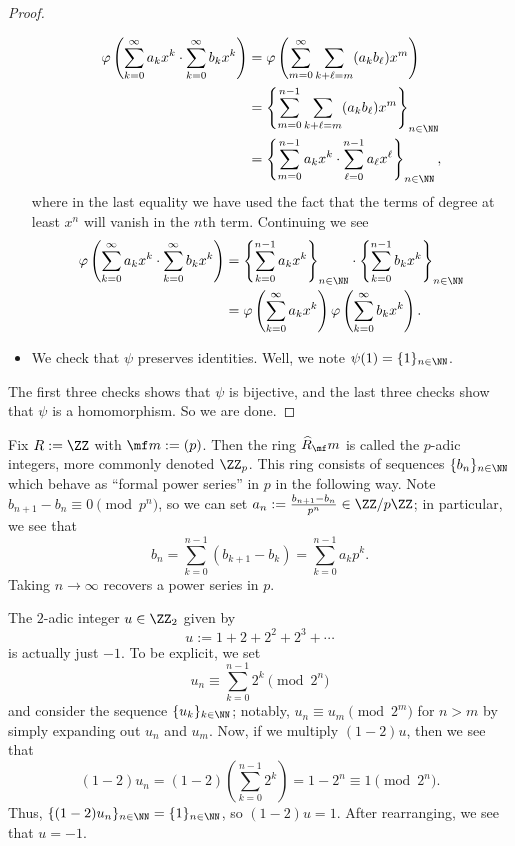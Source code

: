\begin{proof}
\begin{itemize}
		\begin{align*}
			\varphi\left(\sum_{k=0}^\infty a_kx^k\cdot\sum_{k=0}^\infty b_kx^k\right) &= \varphi\left(\sum_{m=0}^\infty\sum_{k+\ell=m}(a_kb_\ell)x^m\right) \\
			&= \left\{\sum_{m=0}^{n-1}\sum_{k+\ell=m}(a_kb_\ell)x^m\right\}_{n\in\NN} \\
			&= \left\{\sum_{m=0}^{n-1}a_kx^k\cdot\sum_{\ell=0}^{n-1}a_\ell x^\ell\right\}_{n\in\NN},
		\end{align*}
		where in the last equality we have used the fact that the terms of degree at least $x^n$ will vanish in the $n$th term. Continuing we see
		\begin{align*}
			\varphi\left(\sum_{k=0}^\infty a_kx^k\cdot\sum_{k=0}^\infty b_kx^k\right) &= \left\{\sum_{k=0}^{n-1}a_kx^k\right\}_{n\in\NN}\cdot\left\{\sum_{k=0}^{n-1}b_kx^k\right\}_{n\in\NN} \\
			&= \varphi\left(\sum_{k=0}^\infty a_kx^k\right)\varphi\left(\sum_{k=0}^\infty b_kx^k\right).
		\end{align*}
		\item We check that $\psi$ preserves identities. Well, we note $\psi(1)=\{1\}_{n\in\NN}$.
	\end{itemize}
	The first three checks shows that $\psi$ is bijective, and the last three checks show that $\psi$ is a homomorphism. So we are done.
\end{proof}
\begin{example}
	Fix $R:=\ZZ$ with $\mf m:=(p)$. Then the ring $\widehat R_\mf m$ is called the $p$-adic integers, more commonly denoted $\ZZ_p$. This ring consists of sequences $\{b_n\}_{n\in\NN}$ which behave as ``formal power series'' in $p$ in the following way. Note $b_{n+1}-b_n\equiv0\pmod{p^n}$, so we can set $a_n:=\frac{b_{n+1}-b_n}{p^n}\in\ZZ/p\ZZ$; in particular, we see that
	\[b_n=\sum_{k=0}^{n-1}(b_{k+1}-b_k)=\sum_{k=0}^{n-1}a_kp^k.\]
	Taking $n\to\infty$ recovers a power series in $p$.
\end{example}
\begin{example}
	The $2$-adic integer $u\in\ZZ_2$ given by
	\[u:=1+2+2^2+2^3+\cdots\]
	is actually just $-1$. To be explicit, we set
	\[u_n\equiv\sum_{k=0}^{n-1}2^k\pmod{2^n}\]
	and consider the sequence $\{u_k\}_{k\in\NN}$; notably, $u_n\equiv u_m\pmod{2^m}$ for $n>m$ by simply expanding out $u_n$ and $u_m$. Now, if we multiply $(1-2)u$, then we see that
	\[(1-2)u_n=(1-2)\left(\sum_{k=0}^{n-1}2^k\right)=1-2^n\equiv1\pmod{2^n}.\]
	Thus, $\{(1-2)u_n\}_{n\in\NN}=\{1\}_{n\in\NN}$, so $(1-2)u=1$. After rearranging, we see that $u=-1$.
\end{example}

